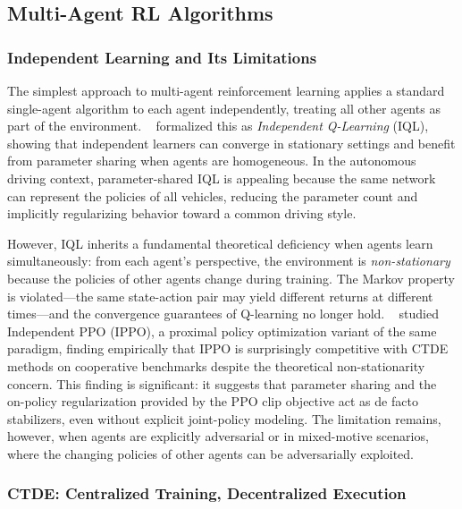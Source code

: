 \documentclass[12pt, a4paper]{article}
\begin{document}
\subsection{Multi-Agent RL Algorithms}
\label{sec:marl_alg}

\subsubsection{Independent Learning and Its Limitations}

The simplest approach to multi-agent reinforcement learning applies a
standard single-agent algorithm to each agent independently, treating all
other agents as part of the environment.  \citeauthor{tan1993multi}~%
\cite{tan1993multi} formalized this as \emph{Independent Q-Learning} (IQL),
showing that independent learners can converge in stationary settings and
benefit from parameter sharing when agents are homogeneous.  In the autonomous
driving context, parameter-shared IQL is appealing because the same network
can represent the policies of all vehicles, reducing the parameter count and
implicitly regularizing behavior toward a common driving style.

However, IQL inherits a fundamental theoretical deficiency when agents learn
simultaneously: from each agent's perspective, the environment is
\emph{non-stationary} because the policies of other agents change during
training.  The Markov property is violated---the same state-action pair may
yield different returns at different times---and the convergence guarantees of
Q-learning no longer hold.  \citeauthor{de2020independent}~\cite{de2020independent}
studied Independent PPO (IPPO), a proximal policy optimization variant of the
same paradigm, finding empirically that IPPO is surprisingly competitive with
CTDE methods on cooperative benchmarks despite the theoretical
non-stationarity concern.  This finding is significant: it suggests that
parameter sharing and the on-policy regularization provided by the PPO clip
objective act as de facto stabilizers, even without explicit joint-policy
modeling.  The limitation remains, however, when agents are explicitly
adversarial or in mixed-motive scenarios, where the changing policies of
other agents can be adversarially exploited.

\subsubsection{CTDE: Centralized Training, Decentralized Execution}
\end{document}
